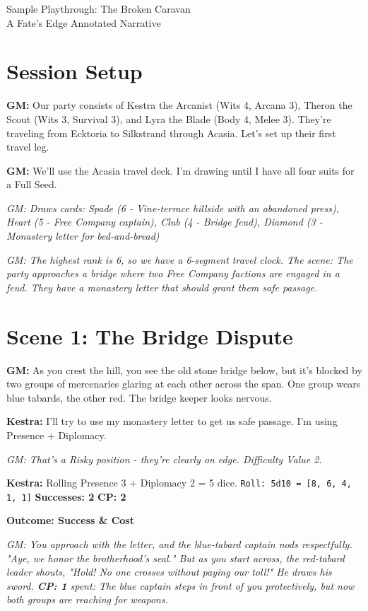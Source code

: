\documentclass[11pt]{article}
\newcommand{\player}[1]{\textbf{#1:}}
\newcommand{\gm}[1]{\textit{GM: #1}}
\newcommand{\roll}[2]{\texttt{Roll: #1d10 = [#2]}}
\newcommand{\success}[1]{\textbf{Successes: #1}}
\newcommand{\cp}[1]{\textbf{CP: #1}}
\newcommand{\outcome}[1]{\textbf{Outcome: #1}}
\begin{document}
\begin{center}
{\LARGE Sample Playthrough: The Broken Caravan}\\
\vspace{0.5em}
{\large A Fate's Edge Annotated Narrative}
\end{center}

\section*{Session Setup}

\player{GM} Our party consists of Kestra the Arcanist (Wits 4, Arcana 3), Theron the Scout (Wits 3, Survival 3), and Lyra the Blade (Body 4, Melee 3). They're traveling from Ecktoria to Silkstrand through Acasia. Let's set up their first travel leg.

\player{GM} We'll use the Acasia travel deck. I'm drawing until I have all four suits for a Full Seed.

\gm{Draws cards: Spade (6 - Vine-terrace hillside with an abandoned press), Heart (5 - Free Company captain), Club (4 - Bridge feud), Diamond (3 - Monastery letter for bed-and-bread)}

\gm{The highest rank is 6, so we have a 6-segment travel clock. The scene: The party approaches a bridge where two Free Company factions are engaged in a feud. They have a monastery letter that should grant them safe passage.}

\section*{Scene 1: The Bridge Dispute}

\player{GM} As you crest the hill, you see the old stone bridge below, but it's blocked by two groups of mercenaries glaring at each other across the span. One group wears blue tabards, the other red. The bridge keeper looks nervous.

\player{Kestra} I'll try to use my monastery letter to get us safe passage. I'm using Presence + Diplomacy.

\gm{That's a Risky position - they're clearly on edge. Difficulty Value 2.}

\player{Kestra} Rolling Presence 3 + Diplomacy 2 = 5 dice. \roll{5}{8, 6, 4, 1, 1} \success{2} \cp{2}

\outcome{Success \& Cost}

\gm{You approach with the letter, and the blue-tabard captain nods respectfully. "Aye, we honor the brotherhood's seal." But as you start across, the red-tabard leader shouts, "Hold! No one crosses without paying our toll!" He draws his sword. \cp{1} spent: The blue captain steps in front of you protectively, but now both groups are reaching for weapons.}
\end{document}
